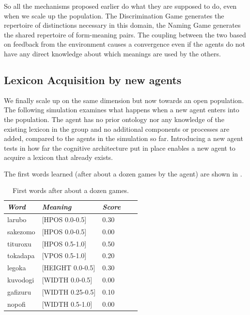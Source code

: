 So all the mechanisms proposed earlier 
do what they are supposed to do, even when we 
scale up the population. The Discrimination 
Game generates the repertoire of distinctions 
necessary in this domain, the Naming Game generates
the shared repertoire of form-meaning pairs. The 
coupling between the two based on feedback from 
the environment causes a convergence even if the
agents do not have any direct knowledge about 
which meanings are used by the others. 

\subsection{Lexicon Acquisition by new agents}

We finally scale up on the same dimension but 
now towards an open population. The following 
simulation examines what happens when a new agent 
enters into the population. The agent has no 
prior ontology nor any knowledge of the existing
lexicon in the group and no additional components
or processes are added, compared to the agents
in the simulation so far. Introducing a new 
agent tests in how far the cognitive architecture
put in place enables a new agent to acquire a 
lexicon that already exists. 

The first words learned (after about a dozen 
games by the agent) are shown in . 
\begin{table}
\begin{center}
\begin{tabular}{ l  l  l  l  l }
\lsptoprule
{\it Word} & {\it Meaning} & {\it Score} \\ \midrule
larubo  & [HPOS 0.0-0.5] & 0.30 \\ \midrule
sakezomo &  [HPOS 0.0-0.5] & 0.00 \\ \midrule
tituroxu &  [HPOS 0.5-1.0] & 0.50 \\ \midrule
tokadapa & [VPOS 0.5-1.0] & 0.20 \\ \midrule
legoka   & [HEIGHT 0.0-0.5] & 0.30 \\ \midrule
kuvodogi  & [WIDTH 0.0-0.5] & 0.00 \\ \midrule
gafizuru &  [WIDTH 0.25-0.5] & 0.10  \\ \midrule
nopofi  & [WIDTH 0.5-1.0] & 0.00 \\ \midrule
\end{tabular}
\caption{\label{tab:first} First words after about a dozen games.}
\end{center}
\end{table}

